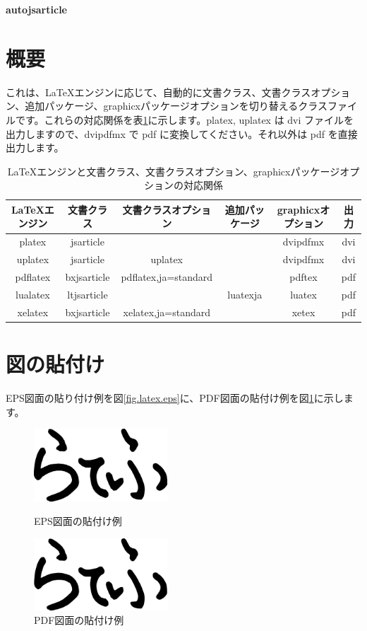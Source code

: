 \documentclass{autojsarticle}
\begin{document}
\begin{center}
	\huge\bfseries autojsarticle
\end{center}

\section{概要}

これは、\LaTeX エンジンに応じて、自動的に文書クラス、文書クラスオプション、追加パッケージ、graphicxパッケージオプションを切り替えるクラスファイルです。これらの対応関係を表\ref{tbl.correspondence}に示します。platex, uplatex は dvi ファイルを出力しますので、dvipdfmx で pdf に変換してください。それ以外は pdf を直接出力します。

\begin{table}[h]
	\centering
	\caption{\LaTeX エンジンと文書クラス、文書クラスオプション、graphicxパッケージオプションの対応関係}
	\label{tbl.correspondence}
	\begin{tabular}{|c|c|c|c|c|c|}
		\hline 
		\LaTeX エンジン & 文書クラス & 文書クラスオプション & 追加パッケージ & graphicxオプション & 出力 \\ 
		\hline\hline 
		platex & jsarticle & & & dvipdfmx & dvi \\ 
		\hline 
		uplatex & jsarticle & uplatex & & dvipdfmx & dvi \\ 
		\hline 
		pdflatex & bxjsarticle & pdflatex,ja=standard & & pdftex & pdf\\ 
		\hline 
		lualatex & ltjsarticle &  & luatexja & luatex & pdf\\ 
		\hline 
		xelatex & bxjsarticle & xelatex,ja=standard & & xetex & pdf\\ 
		\hline 
	\end{tabular} 
\end{table}

\section{図の貼付け}

EPS図面の貼り付け例を図\ref{fig.latex.eps}に、PDF図面の貼付け例を図\ref{fig.latex.pdf}に示します。

\begin{figure}[h]
	\centering
	\includegraphics[width=5cm]{latex.eps}
	\caption{EPS図面の貼付け例}
	\label{fig.latex.eps}
	\bigskip
	\includegraphics[width=5cm]{latex.pdf}
	\caption{PDF図面の貼付け例}
	\label{fig.latex.pdf}
\end{figure}
\end{document}
